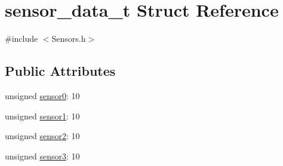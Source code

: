 \hypertarget{structsensor__data__t}{\section{sensor\-\_\-data\-\_\-t Struct Reference}
\label{structsensor__data__t}
}


{\ttfamily \#include $<$Sensors.\-h$>$}

\subsection*{Public Attributes}
\begin{DoxyCompactItemize}
\item 
unsigned \hyperlink{structsensor__data__t_a5e3aabb61d03d3fc430ef04510e8e2c9}{sensor0}\-: 10
\item 
unsigned \hyperlink{structsensor__data__t_a3b5a0377093a58e2274b4a20c32d3a29}{sensor1}\-: 10
\item 
unsigned \hyperlink{structsensor__data__t_a59737ac12356411b9dba475e54aed0fb}{sensor2}\-: 10
\item 
unsigned \hyperlink{structsensor__data__t_ad0464ebc7e50414c3256cd26f4138258}{sensor3}\-: 10
\end{DoxyCompactItemize}


